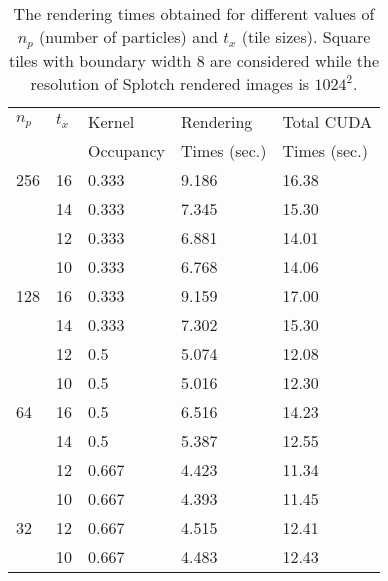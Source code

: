 \documentclass[1p]{elsarticle}
\begin{document}
\begin{table}
\begin{center}
\begin{tabular}{|l|l|l|l|l|}
\hline
$n_p$ & $t_x$ & Kernel & Rendering & Total CUDA \\
& & Occupancy & Times (sec.) & Times (sec.) \\
\hline
256   & 16 & 0.333 & 9.186 & 16.38 \\
\hline
      & 14 & 0.333 & 7.345  & 15.30 \\
\hline
      & 12 & 0.333 & 6.881  & 14.01 \\
\hline
      & 10 & 0.333 & 6.768 & 14.06 \\
\hline
128   & 16 & 0.333 & 9.159 & 17.00 \\
\hline
      & 14 & 0.333 & 7.302  & 15.30 \\
\hline
      & 12 & 0.5 & 5.074  & 12.08 \\
\hline
      & 10 & 0.5 & 5.016 & 12.30 \\ 
\hline
64    & 16 & 0.5 & 6.516 & 14.23 \\
\hline
      & 14 & 0.5 & 5.387 & 12.55 \\
\hline
      & 12 & 0.667 & 4.423 & 11.34 \\
\hline
      & 10 & 0.667 & 4.393 & 11.45 \\ 
\hline
32    & 12 & 0.667 & 4.515 & 12.41 \\
\hline
      & 10 & 0.667 & 4.483 & 12.43 \\ 
\hline
\end{tabular}
\end{center}
\caption{The rendering times obtained for different values of $n_p$ (number of particles) and $t_x$ (tile sizes). Square tiles with boundary width 8 are considered while the resolution of Splotch rendered images is $1024^{2}.$}
\label{tab:tuning}
\end{table}

\end{document}
